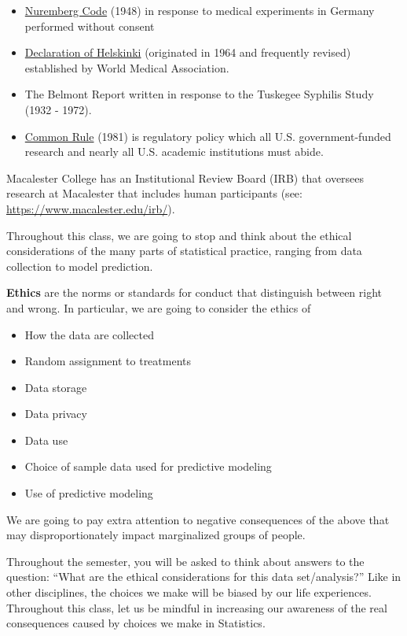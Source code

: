\documentclass[
]{book}
\providecommand{\tightlist}{%
  \setlength{\itemsep}{0pt}\setlength{\parskip}{0pt}}
\begin{document}
\begin{itemize}
\tightlist
\item
  \href{https://www.nejm.org/doi/full/10.1056/NEJM199711133372006}{Nuremberg Code} (1948) in response to medical experiments in Germany performed without consent
\item
  \href{https://www.wma.net/what-we-do/medical-ethics/}{Declaration of Helskinki} (originated in 1964 and frequently revised) established by World Medical Association.
\item
  The Belmont Report written in response to the Tuskegee Syphilis Study (1932 - 1972).
\item
  \href{https://www.hhs.gov/ohrp/regulations-and-policy/regulations/common-rule/index.html}{Common Rule} (1981) is regulatory policy which all U.S. government-funded research and nearly all U.S. academic institutions must abide.
\end{itemize}

Macalester College has an Institutional Review Board (IRB) that oversees research at Macalester that includes human participants (see: \url{https://www.macalester.edu/irb/}).

Throughout this class, we are going to stop and think about the ethical considerations of the many parts of statistical practice, ranging from data collection to model prediction.

\textbf{Ethics} are the norms or standards for conduct that distinguish between right and wrong. In particular, we are going to consider the ethics of

\begin{itemize}
\tightlist
\item
  How the data are collected
\item
  Random assignment to treatments
\item
  Data storage
\item
  Data privacy
\item
  Data use
\item
  Choice of sample data used for predictive modeling
\item
  Use of predictive modeling
\end{itemize}

We are going to pay extra attention to negative consequences of the above that may disproportionately impact marginalized groups of people.

Throughout the semester, you will be asked to think about answers to the question: ``What are the ethical considerations for this data set/analysis?'' Like in other disciplines, the choices we make will be biased by our life experiences. Throughout this class, let us be mindful in increasing our awareness of the real consequences caused by choices we make in Statistics.
\end{document}
